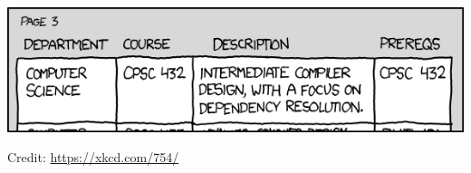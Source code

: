 \documentclass[a4paper]{article}
\begin{document}

\begin{onlysolution}
  \begin{center}
    \includegraphics[scale=0.5]{xkcd_754}

    \scriptsize Credit: \href{https://xkcd.com/754/}{https://xkcd.com/754/}
  \end{center}
\end{onlysolution}




\end{document}
